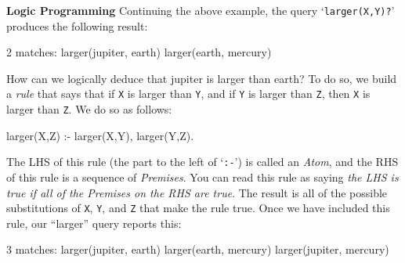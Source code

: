 \begin{minipage}[t]{\sw}
\slidenumber
\LARGE
{\bf Logic Programming}\exx
Continuing the above example,
the query `\verb'larger(X,Y)?''
produces the following result:
{\Large
\begin{qv}
2 matches:
larger(jupiter, earth)
larger(earth, mercury)
\end{qv}
}
How can we logically deduce that jupiter is larger than earth?
To do so, we build a {\em rule} that says that
if \verb'X' is larger than \verb'Y',
and if \verb'Y' is larger than \verb'Z',
then \verb'X' is larger than \verb'Z'.
We do so as follows:
{\Large
\begin{qv}
larger(X,Z) :- larger(X,Y), larger(Y,Z).
\end{qv}
}
The LHS of this rule (the part to the left of `\verb':-'')
is called an {\em Atom},
and the RHS of this rule is a sequence of {\em Premises}.
You can read this rule as saying
{\em the LHS is true if all of the Premises on the RHS are true}.
The result is all of the possible substitutions
of \verb'X', \verb'Y', and \verb'Z'
that make the rule true.\exx
Once we have included this rule, our ``larger'' query reports this:
{\Large
\begin{qv}
3 matches:
larger(jupiter, earth)
larger(earth, mercury)
larger(jupiter, mercury)
\end{qv}
}
\end{minipage}
